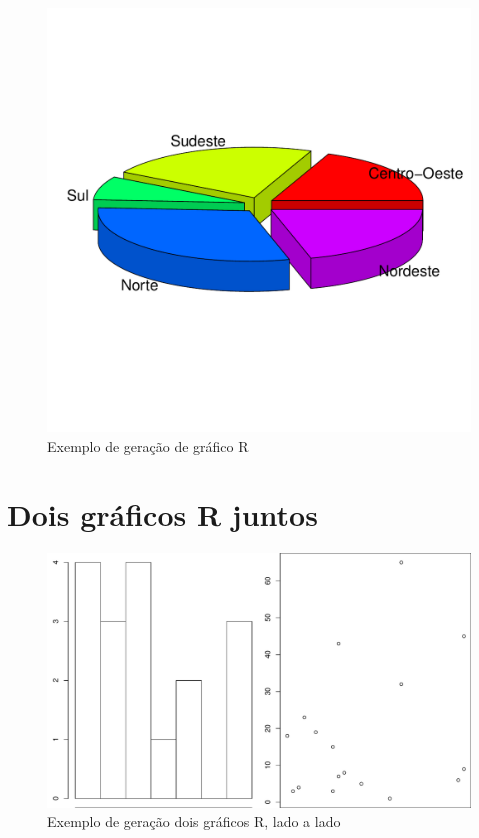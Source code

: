 \documentclass[
	12pt,				%
	oneside,			%
	a4paper,			%
	english,			%
	french,				%
	spanish,			%
	brazil				%
	]{abntex2}
\begin{document}
\begin{figure}[htbp]
\hypertarget{pizza}{%
\caption{Exemplo de geração de gráfico R}\label{pizza}
\begin{center}
\includegraphics[scale=0.4]{imagens/R/pizza-grafico.pdf}
\end{center}
}
\end{figure}

\hypertarget{dois-gruxe1ficos-r-juntos}{%
\chapter{Dois gráficos R juntos}\label{dois-gruxe1ficos-r-juntos}}

\begin{figure}[htbp]
\hypertarget{doisgraficos}{%
\caption{Exemplo de geração dois gráficos R, lado a lado}\label{doisgraficos}
\begin{center}
\includegraphics[scale=0.4]{imagens/R/dois-graficos.pdf}
\end{center}
}
\end{figure}
\end{document}
